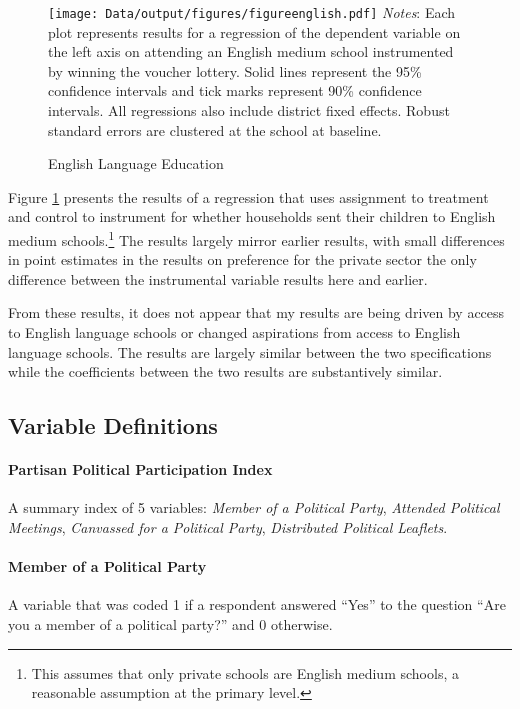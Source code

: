 \documentclass[hidelinks, 12pt, titlepage]{article}
\begin{document}
			\begin{figure}[htbp]
				\caption{English Language Education\label{fig:english}}
				\centering
				\begin{minipage}{5.5in}
					\texttt{[image: Data/output/figures/figureenglish.pdf]}
					\footnotesize
					\emph{Notes}: Each plot represents results for a regression of the dependent variable on the left axis on attending an English medium school instrumented by winning the voucher lottery.  Solid lines represent the 95\% confidence intervals and tick marks represent 90\% confidence intervals.  All regressions also include district fixed effects.  Robust standard errors are clustered at the school at baseline.
				\end{minipage}
			\end{figure}

			Figure \ref{fig:english} presents the results of a regression that uses assignment to treatment and control to instrument for whether households sent their children to English medium schools.\footnote{This assumes that only private schools are English medium schools, a reasonable assumption at the primary level.}  The results largely mirror earlier results, with small differences in point estimates in the results on preference for the private sector the only difference between the instrumental variable results here and earlier.
			
			From these results, it does not appear that my results are being driven by access to English language schools or changed aspirations from access to English language schools.  The results are largely similar between the two specifications while the coefficients between the two results are substantively similar.

		\clearpage

		\subsection{Variable Definitions\label{appendix:var_def}}

			\paragraph{Partisan Political Participation Index} A summary index of 5 variables: \emph{Member of a Political Party}, \emph{Attended Political Meetings}, \emph{Canvassed for a Political Party}, \emph{Distributed Political Leaflets}.

			\paragraph{Member of a Political Party} A variable that was coded 1 if a respondent answered ``Yes'' to the question ``Are you a member of a political party?'' and 0 otherwise.
\end{document}
